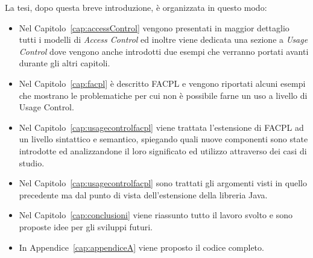 La tesi, dopo questa breve introduzione, è organizzata in questo modo: 
\begin{itemize}
\item Nel Capitolo~\ref{cap:accessControl} vengono
presentati in maggior dettaglio tutti i modelli di \textit{Access Control} ed inoltre viene dedicata una sezione a \textit{Usage Control}
dove vengono anche introdotti due esempi che verranno portati avanti
durante gli altri capitoli.
\item Nel Capitolo~\ref{cap:facpl} è descritto \ac{FACPL} e vengono riportati alcuni esempi che mostrano le problematiche per cui non è possibile farne un uso a livello di Usage Control.
\item Nel Capitolo~\ref{cap:usagecontrolfacpl} viene trattata l’estensione di \ac{FACPL} ad un livello sintattico
e semantico, spiegando quali nuove componenti sono state introdotte ed
analizzandone il loro significato ed utilizzo attraverso dei casi di studio.
\item Nel Capitolo~\ref{cap:usagecontrolfacpl} sono trattati gli argomenti
visti in quello precedente ma dal punto di vista dell’estensione della
libreria Java.
\item Nel Capitolo~\ref{cap:conclusioni} viene riassunto tutto il lavoro svolto e sono proposte idee per gli sviluppi futuri.

\item In Appendice~\ref{cap:appendiceA} viene proposto il codice completo.
\end{itemize}

